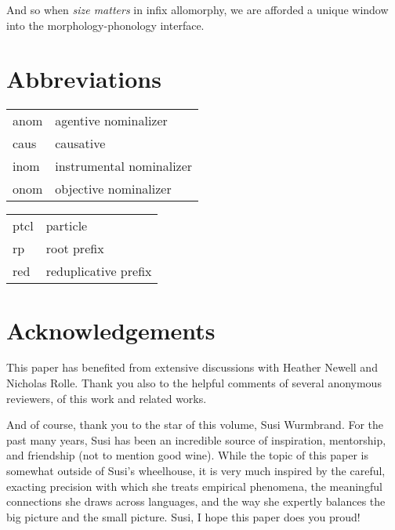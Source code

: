 \documentclass[output=paper,colorlinks,citecolor=brown,
]{langscibook}
\begin{document}
And so when {\it size matters} in infix allomorphy, we are afforded a unique window into the morphology-phonology interface.



\section*{Abbreviations}
\begin{tabularx}{.5\textwidth}{lQ}
{\sc anom} & agentive nominalizer \\
{\sc caus} & causative \\
{\sc inom} & instrumental nominalizer\\
{\sc onom} & objective nominalizer\\
\end{tabularx}
\begin{tabularx}{.5\textwidth}{lQ}
{\sc ptcl} & particle\\
{\sc rp} & root prefix\\
{\sc red} & reduplicative prefix\\
\end{tabularx}

\section*{Acknowledgements}

This paper has benefited from extensive discussions with Heather Newell and Nicholas Rolle. Thank you also to the helpful comments of several anonymous reviewers, of this work and related works. 

And of course, thank you to the star of this volume, Susi Wurmbrand. For the past many years, Susi has been an incredible source of inspiration, mentorship, and friendship (not to mention good wine). While the topic of this paper is somewhat outside of Susi's wheelhouse, it is very much inspired by the careful, exacting precision with which she treats empirical phenomena, the meaningful connections she draws across languages, and the way she expertly balances the big picture and the small picture. Susi, I hope this paper does you proud!

\printbibliography[heading=subbibliography,notkeyword=this]
\end{document}
